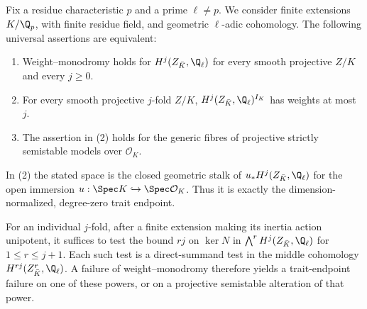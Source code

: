 \begin{theorem}
\label{c:universal-trait-weight-equivalence}
Fix a residue characteristic $p$ and a prime $\ell\ne p$.
We consider finite extensions $K/\Q_p$, with finite residue
field, and geometric $\ell$-adic cohomology.  The following
universal assertions are equivalent:
\begin{enumerate}
\item Weight--monodromy holds for $H^j(Z_{\bar K},\Q_\ell)$
for every smooth projective $Z/K$ and every $j\geq0$.
\item For every smooth projective $j$-fold $Z/K$,
$H^j(Z_{\bar K},\Q_\ell)^{I_K}$ has weights at most $j$.
\item The assertion in (2) holds for the generic fibres of
projective strictly semistable models over $\mathcal O_K$.
\end{enumerate}
In (2) the stated space is the closed geometric stalk of
$u_*H^j(Z_{\bar K},\Q_\ell)$ for the open immersion
$u:\Spec K\hookrightarrow\Spec\mathcal O_K$.  Thus it is exactly
the dimension-normalized, degree-zero trait endpoint.

For an individual $j$-fold, after a finite extension making its
inertia action unipotent, it suffices to test the bound
$rj$ on $\ker N$ in
$\bigwedge^r H^j(Z_{\bar K},\Q_\ell)$ for $1\leq r\leq j+1$.
Each such test is a direct-summand test in the middle cohomology
$H^{rj}(Z^r_{\bar K},\Q_\ell)$.  A failure of weight--monodromy
therefore yields a trait-endpoint failure on one of these powers,
or on a projective semistable alteration of that power.
\end{theorem}

